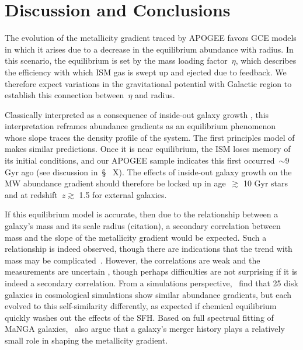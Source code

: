 
%



%

\section{Discussion and Conclusions}
\label{outflows:sec:disc-conc}

The evolution of the metallicity gradient traced by APOGEE favors GCE models in
which it arises due to a decrease in the equilibrium abundance with radius.
In this scenario, the equilibrium is set by the mass loading factor~$\eta$,
which describes the efficiency with which ISM gas is swept up and ejected due
to feedback.
We therefore expect variations in the gravitational potential with Galactic
region to establish this connection between~$\eta$ and radius.
\par
Classically interpreted as a consequence of inside-out galaxy growth
\citep[e.g.,][]{Kauffmann1996}, this interpretation reframes abundance
gradients as an equilibrium phenomenon whose slope traces the density profile
of the system.
The first principles model of~\citet{Sharda2021b} makes similar predictions.
Once it is near equilibrium, the ISM loses memory of its initial conditions,
and our APOGEE sample indicates this first occurred~$\sim$$9$ Gyr ago (see
discussion in~\S~{\color{red} X}).
The effects of inside-out galaxy growth on the MW abundance gradient should
therefore be locked up in age~$\gtrsim$ 10 Gyr stars and at
redshift~$z \gtrsim$ 1.5 for external galaxies.
\par
If this equilibrium model is accurate, then due to the relationship between
a galaxy's mass and its scale radius {\color{red} (citation)}, a secondary
correlation between mass and the slope of the metallicity gradient would be
expected.
Such a relationship is indeed observed, though there are indications that the
trend with mass may be complicated~\citep{Belfiore2017, Maiolino2019}.
However, the correlations are weak and the measurements are uncertain
\citep{Yuan2013, Acharyya2020, Poetrodjojo2018}, though perhaps difficulties
are not surprising if it is indeed a secondary correlation.
From a simulations perspective,~\citet{Pilkington2012} find that 25 disk
galaxies in cosmological simulations show similar abundance gradients, but
each evolved to this self-similarity differently, as expected if chemical
equilibrium quickly washes out the effects of the SFH.
Based on full spectrual fitting of MaNGA galaxies,~\citet{Goddard2017} also
argue that a galaxy's merger history plays a relatively small role in shaping
the metallicity gradient.


